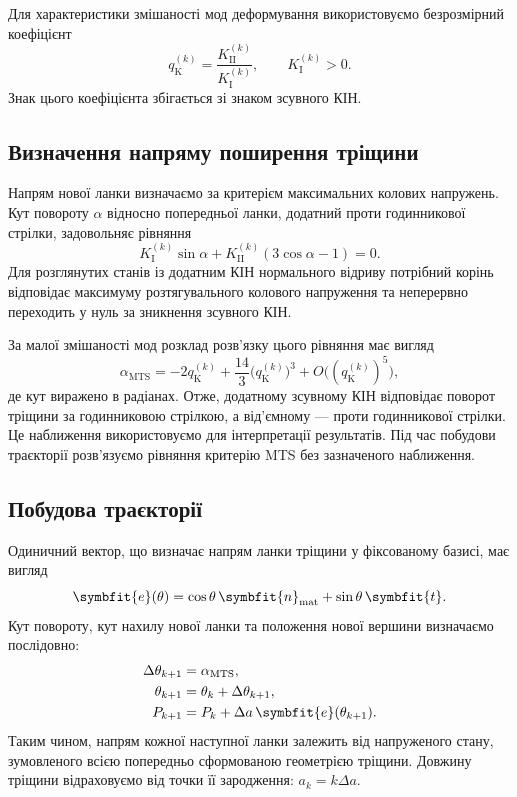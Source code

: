 \documentclass[a4paper,12pt]{article}
\newcommand{\bm}[1]{\ifstrequal{#1}{0}{\symbf{#1}}{\symbfit{#1}}}
\begin{document}
Для характеристики змішаності мод деформування використовуємо безрозмірний коефіцієнт
\begin{equation}
 q_{\mathrm K}^{(k)}=\frac{K_{\mathrm{II}}^{(k)}}{K_{\mathrm I}^{(k)}},
 \qquad K_{\mathrm I}^{(k)}>0.
 \label{eq:mode-mixity}
\end{equation}
Знак цього коефіцієнта збігається зі знаком зсувного КІН.

\subsection{Визначення напряму поширення тріщини}
Напрям нової ланки визначаємо за критерієм максимальних колових напружень.
Кут повороту $\alpha$ відносно попередньої ланки, додатний проти годинникової стрілки, задовольняє рівняння
\begin{equation}
 K_{\mathrm I}^{(k)}\sin\alpha+
 K_{\mathrm{II}}^{(k)}(3\cos\alpha-1)=0.
 \label{eq:mts-angle}
\end{equation}
Для розглянутих станів із додатним КІН нормального відриву потрібний корінь відповідає максимуму
розтягувального колового напруження та неперервно переходить у нуль за зникнення зсувного КІН.

За малої змішаності мод розклад розв’язку цього рівняння має вигляд
\begin{equation}
 \alpha_{\mathrm{MTS}}
 =-2q_{\mathrm K}^{(k)}
 +\frac{14}{3}\bigl(q_{\mathrm K}^{(k)}\bigr)^3
 +O\bigl((q_{\mathrm K}^{(k)})^5\bigr),
 \label{eq:mts-small-mixity}
\end{equation}
де кут виражено в радіанах. Отже, додатному зсувному КІН відповідає поворот тріщини за годинниковою
стрілкою, а від’ємному --- проти годинникової стрілки.
Це наближення використовуємо для інтерпретації результатів. Під час побудови траєкторії розв’язуємо
рівняння критерію MTS без зазначеного наближення.

\subsection{Побудова траєкторії}
Одиничний вектор, що визначає напрям ланки тріщини у фіксованому базисі, має вигляд
\begin{equation}
 \bm e(\theta)=\cos\theta\,\bm n_{\mathrm{mat}}+\sin\theta\,\bm t.
 \label{eq:direction}
\end{equation}
Кут повороту, кут нахилу нової ланки та положення нової вершини визначаємо послідовно:
\begin{align}
 \Delta\theta_{k+1}&=\alpha_{\mathrm{MTS}},\label{eq:turn}\\
 \theta_{k+1}&=\theta_k+\Delta\theta_{k+1},\label{eq:angleupdate}\\
 P_{k+1}&=P_k+\Delta a\,\bm e(\theta_{k+1}).\label{eq:pointupdate}
\end{align}
Таким чином, напрям кожної наступної ланки залежить від напруженого стану, зумовленого всією
попередньо сформованою геометрією тріщини. Довжину тріщини відраховуємо від точки її зародження: $a_k=k\Delta a$.
\end{document}
